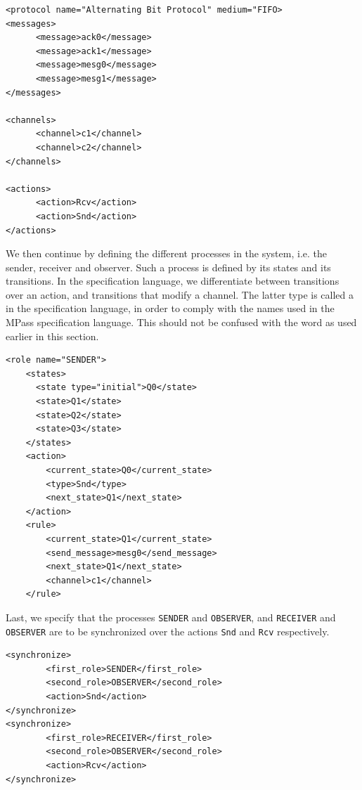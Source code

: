 \lstset{language=XML} 
\begin{lstlisting}[frame=single]
<protocol name="Alternating Bit Protocol" medium="FIFO>
<messages>
      <message>ack0</message>
      <message>ack1</message>
      <message>mesg0</message>
      <message>mesg1</message>
</messages>

<channels>
      <channel>c1</channel>
      <channel>c2</channel>
</channels>

<actions>
      <action>Rcv</action>
      <action>Snd</action>
</actions>
\end{lstlisting}

We then continue by defining the different processes in the system, i.e. the sender, receiver and observer. Such a process is defined by its states and its transitions. In the specification language, we differentiate between transitions over an action, and transitions that modify a channel. The latter type is called a  in the specification language, in order to comply with the names used in the MPass specification language. This should not be confused with the word as used earlier in this section.

\begin{lstlisting}[frame=single]
  <role name="SENDER">
    <states>
      <state type="initial">Q0</state>
      <state>Q1</state>
      <state>Q2</state>
      <state>Q3</state>
    </states>
    <action>
        <current_state>Q0</current_state>
        <type>Snd</type>        
        <next_state>Q1</next_state>
    </action>
    <rule>
        <current_state>Q1</current_state>
        <send_message>mesg0</send_message>
        <next_state>Q1</next_state>
        <channel>c1</channel>
    </rule>
\end{lstlisting}

Last, we specify that the processes \texttt{SENDER} and \texttt{OBSERVER}, and  \texttt{RECEIVER} and \texttt{OBSERVER} are to be synchronized over the actions \texttt{Snd} and \texttt{Rcv} respectively. 

\begin{lstlisting}[frame=single]
<synchronize>
        <first_role>SENDER</first_role>
        <second_role>OBSERVER</second_role>
        <action>Snd</action>
</synchronize>
<synchronize>
        <first_role>RECEIVER</first_role>
        <second_role>OBSERVER</second_role>
        <action>Rcv</action>
</synchronize>
\end{lstlisting}

\swreceiver

\swobserver

\swsender
